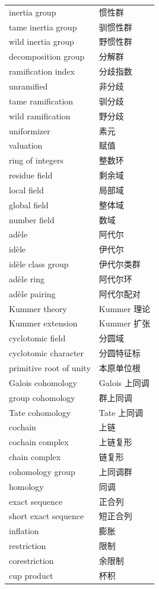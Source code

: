 \begin{longtable}{p{}p{}}
inertia group & 惯性群 \\
tame inertia group & 驯惯性群 \\
wild inertia group & 野惯性群 \\
decomposition group & 分解群 \\
ramification index & 分歧指数 \\
unramified & 非分歧 \\
tame ramification & 驯分歧 \\
wild ramification & 野分歧 \\
uniformizer & 素元 \\
valuation & 赋值 \\
ring of integers & 整数环 \\
residue field & 剩余域 \\
local field & 局部域 \\
global field & 整体域 \\
number field & 数域 \\
adèle & 阿代尔 \\
idèle & 伊代尔 \\
idèle class group & 伊代尔类群 \\
adèle ring & 阿代尔环 \\
adèle pairing & 阿代尔配对 \\
Kummer theory & Kummer 理论 \\
Kummer extension & Kummer 扩张 \\
cyclotomic field & 分圆域 \\
cyclotomic character & 分圆特征标 \\
primitive root of unity & 本原单位根 \\
Galois cohomology & Galois 上同调 \\
group cohomology & 群上同调 \\
Tate cohomology & Tate 上同调 \\
cochain & 上链 \\
cochain complex & 上链复形 \\
chain complex & 链复形 \\
cohomology group & 上同调群 \\
homology & 同调 \\
exact sequence & 正合列 \\
short exact sequence & 短正合列 \\
inflation & 膨胀 \\
restriction & 限制 \\
corestriction & 余限制 \\
cup product & 杯积 \\

\end{longtable}
